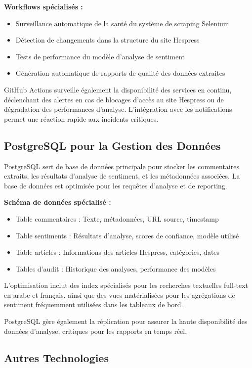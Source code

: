 \textbf{Workflows spécialisés :}
\begin{itemize}
    \item Surveillance automatique de la santé du système de scraping Selenium
    \item Détection de changements dans la structure du site Hespress
    \item Tests de performance du modèle d'analyse de sentiment
    \item Génération automatique de rapports de qualité des données extraites
\end{itemize}

GitHub Actions surveille également la disponibilité des services en continu, déclenchant des alertes en cas de blocages d'accès au site Hespress ou de dégradation des performances d'analyse. L'intégration avec les notifications permet une réaction rapide aux incidents critiques.

\subsection{PostgreSQL pour la Gestion des Données}
PostgreSQL sert de base de données principale pour stocker les commentaires extraits, les résultats d'analyse de sentiment, et les métadonnées associées. La base de données est optimisée pour les requêtes d'analyse et de reporting.

\textbf{Schéma de données spécialisé :}
\begin{itemize}
    \item Table commentaires : Texte, métadonnées, URL source, timestamp
    \item Table sentiments : Résultats d'analyse, scores de confiance, modèle utilisé
    \item Table articles : Informations des articles Hespress, catégories, dates
    \item Tables d'audit : Historique des analyses, performance des modèles
\end{itemize}

L'optimisation inclut des index spécialisés pour les recherches textuelles full-text en arabe et français, ainsi que des vues matérialisées pour les agrégations de sentiment fréquemment utilisées dans les tableaux de bord.

PostgreSQL gère également la réplication pour assurer la haute disponibilité des données d'analyse, critiques pour les rapports en temps réel.

\subsection{Autres Technologies}

